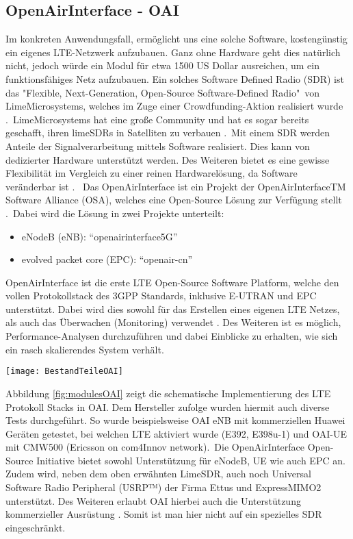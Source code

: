 \subsection{OpenAirInterface - OAI}
\label{OpenAirInterface}
Im konkreten Anwendungsfall, ermöglicht uns eine solche Software, kostengünstig ein eigenes LTE-Netzwerk aufzubauen. 
Ganz ohne Hardware geht dies natürlich nicht, jedoch würde ein Modul für etwa 1500 US Dollar ausreichen, um ein funktionsfähiges Netz aufzubauen. Ein solches Software Defined Radio (SDR) ist das "Flexible, Next-Generation, Open-Source Software-Defined Radio"\ von LimeMicrosystems, welches im Zuge einer Crowdfunding-Aktion realisiert wurde \cite{CroudLime01}.\ LimeMicrosystems hat eine große Community und hat es sogar bereits geschafft, ihren limeSDRs in Satelliten zu verbauen \cite{limeHp}.\ Mit einem SDR werden Anteile der Signalverarbeitung mittels Software realisiert. Dies kann von dedizierter Hardware unterstützt werden. Des Weiteren bietet es eine gewisse Flexibilität im Vergleich zu einer reinen Hardwarelösung, da Software veränderbar ist \cite{jondral2005software}. \ Das OpenAirInterface ist ein Projekt der OpenAirInterfaceTM Software Alliance (OSA), welches eine Open-Source Lösung zur Verfügung stellt \cite{OpenAir19}.\ Dabei wird die Lösung in zwei Projekte unterteilt: 
\begin{itemize}
	\item eNodeB (eNB): “openairinterface5G”
	\item evolved packet core (EPC): “openair-cn”
\end{itemize}

OpenAirInterface ist die erste LTE Open-Source Software Platform, welche den vollen Protokollstack des 3GPP Standards, inklusive E-UTRAN und EPC unterstützt.
Dabei wird dies sowohl für das Erstellen eines eigenen LTE Netzes, als auch das Überwachen (Monitoring) verwendet \cite{nikaein2014openairinterface}.
Des Weiteren ist es möglich, Performance-Analysen durchzuführen und dabei Einblicke zu erhalten, wie sich ein rasch skalierendes System verhält. 
\begin{figure*}[ht]
	\centering
	\texttt{[image: BestandTeileOAI]}
	\caption{Übersicht LTE Module in den jeweiligen Projekten \protect\cite{openAirInterfaceOverview19}}
	\label{fig:modulesOAI}
\end{figure*}
Abbildung \ref{fig:modulesOAI} zeigt die schematische Implementierung des LTE Protokoll Stacks in OAI.
Dem Hersteller zufolge wurden hiermit auch diverse Tests durchgeführt. So wurde beispielsweise OAI eNB mit kommerziellen Huawei Geräten getestet, bei welchen LTE aktiviert wurde (E392, E398u-1) und OAI-UE mit CMW500 (Ericsson on com4Innov network).\ Die OpenAirInterface Open-Source Initiative bietet sowohl Unterstützung für eNodeB, UE wie auch EPC an. Zudem wird, neben dem oben erwähnten LimeSDR, auch noch Universal Software Radio Peripheral (USRP™) der Firma Ettus und ExpressMIMO2 unterstützt. Des Weiteren erlaubt OAI hierbei auch die Unterstützung kommerzieller Ausrüstung \cite{kaltenberger2019openairinterface}. Somit ist man hier nicht auf ein spezielles SDR eingeschränkt.

